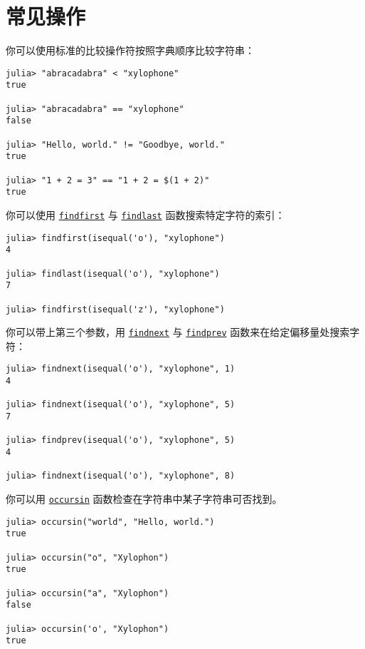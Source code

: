 \hypertarget{2767013232051989875}{}


\section{常见操作}



你可以使用标准的比较操作符按照字典顺序比较字符串：




\begin{verbatim}
julia> "abracadabra" < "xylophone"
true

julia> "abracadabra" == "xylophone"
false

julia> "Hello, world." != "Goodbye, world."
true

julia> "1 + 2 = 3" == "1 + 2 = $(1 + 2)"
true
\end{verbatim}



你可以使用 \hyperlink{13752961745140943082}{\texttt{findfirst}} 与 \hyperlink{16601358451866933976}{\texttt{findlast}} 函数搜索特定字符的索引：




\begin{verbatim}
julia> findfirst(isequal('o'), "xylophone")
4

julia> findlast(isequal('o'), "xylophone")
7

julia> findfirst(isequal('z'), "xylophone")
\end{verbatim}



你可以带上第三个参数，用 \hyperlink{17527118405272566171}{\texttt{findnext}} 与 \hyperlink{5485385242074595664}{\texttt{findprev}} 函数来在给定偏移量处搜索字符：




\begin{verbatim}
julia> findnext(isequal('o'), "xylophone", 1)
4

julia> findnext(isequal('o'), "xylophone", 5)
7

julia> findprev(isequal('o'), "xylophone", 5)
4

julia> findnext(isequal('o'), "xylophone", 8)
\end{verbatim}



你可以用 \hyperlink{7988132114328914630}{\texttt{occursin}} 函数检查在字符串中某子字符串可否找到。




\begin{verbatim}
julia> occursin("world", "Hello, world.")
true

julia> occursin("o", "Xylophon")
true

julia> occursin("a", "Xylophon")
false

julia> occursin('o', "Xylophon")
true
\end{verbatim}



